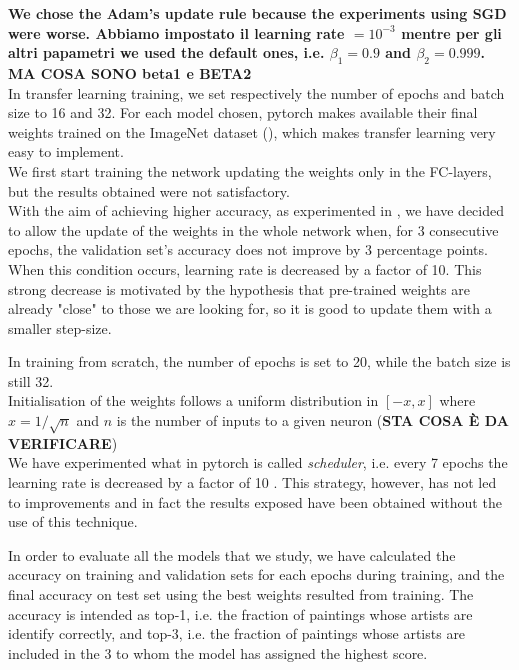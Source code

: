 \documentclass{article}
\begin{document}
\textbf{We chose the Adam's update rule because the experiments using SGD were worse. \textbf{Abbiamo impostato il }learning rate $= 10^{-3}$ mentre per gli altri papametri we used the default ones, i.e. $\beta_{1}  = 0.9$ and $\beta_{2} = 0.999$.  \textbf{MA COSA SONO beta1 e BETA2}}\\
In transfer learning training, we set respectively the number of epochs and batch size to 16 and 32.  For each model chosen, pytorch makes available their final weights  trained on the ImageNet dataset (\cite{imagenet}), which makes transfer learning very easy to implement.\\
We first start training the network updating the weights only in the FC-layers, but the results obtained were not satisfactory.\\
With the aim of achieving higher accuracy, as experimented in \cite{ArtistIdCNN406}, we have decided to allow the update of the weights in the whole network when, for 3 consecutive epochs, the validation set's accuracy does not improve by 3 percentage points. When this condition occurs, learning rate is decreased by a factor of 10. This strong decrease is motivated by the hypothesis  that pre-trained weights are already "close" to those we are looking for, so it is good to update them with a smaller step-size.

In training from scratch, the number of epochs is set to 20, while the batch size is still 32.\\ 
Initialisation of the weights follows a uniform distribution in $[-x, x]$ where $x=1/\sqrt n$ and $n$ is the number of inputs to a given neuron (\textbf{STA COSA È DA VERIFICARE})\\
We have experimented what in pytorch is called \textit{scheduler}, i.e. every 7 epochs the learning rate is decreased by a factor of 10 . This strategy, however, has not led to improvements and in fact the results exposed have been obtained without the use of this technique.

In order to evaluate all the models that we study, we have calculated the accuracy on training and validation sets for each epochs during training, and the final accuracy on test set using the best weights resulted from training. The accuracy is intended as top-1, i.e.  the fraction of paintings whose artists are identify correctly, and top-3, i.e. the fraction of paintings whose artists are included in the 3 to whom the model has assigned the highest score.
\end{document}
